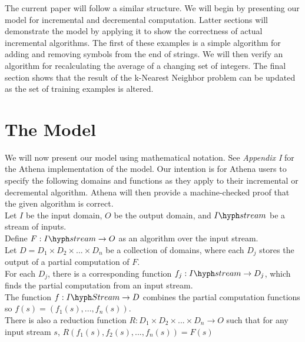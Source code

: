 \documentclass[30pt]{article}
\begin{document}
\indent The current paper will follow a similar structure. We will begin by presenting our model for incremental and decremental computation. Latter sections will demonstrate the model by applying it to show the correctness of actual incremental algorithms. The first of these examples is a simple algorithm for adding and removing symbols from the end of strings. We will then verify an algorithm for recalculating the average of a changing set of integers. The final section shows that the result of the k-Nearest Neighbor problem can be updated as the set of training examples is altered.

\section{The Model}
\large

\noindent We will now present our model using mathematical notation. See \emph{Appendix I} for the Athena implementation of the model. Our intention is for Athena users to specify the following domains and functions as they apply to their incremental or decremental algorithm. Athena will then provide a machine-checked proof that the given algorithm is correct. \\

\noindent  Let $I$ be the input domain, $O$ be the output domain, and $I\hyph stream$ be a stream of inputs. \\

\noindent Define $F: I\hyph stream \rightarrow O$ as an algorithm over the input stream.\\

\noindent Let $D = D_1 \times D_2 \times ... \times  D_n $ be a collection of domains, where each $D_j$ stores the output of a partial computation of $F$.\\

\noindent For each $D_j$, there is a corresponding function $f_j : I\hyph stream \rightarrow D_j$, which finds the partial computation from an input stream.\\

\noindent The function $f: I\hyph Stream \rightarrow D$  combines the partial computation functions so $f(s) = (f_1(s),...,f_n(s))$.\\

\noindent There is also a reduction function $R: D_1 \times D_2 \times ... \times D_n \rightarrow O$ such that for any input stream $s$,  $R(f_1(s),f_2(s),...,f_n(s)) = F(s)$\\
\end{document}

